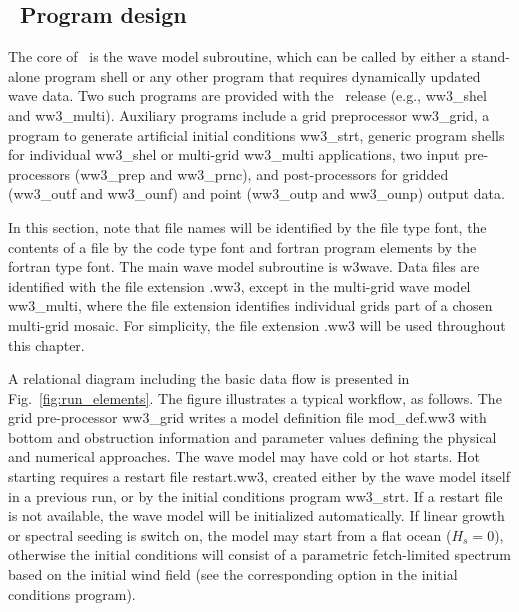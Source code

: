 \vsssub
\subsection{~Program design} \label{run:design}
\vssub

The core of \ws\ is the wave model subroutine, which can be
called by either a stand-alone program shell or any other program that
requires dynamically updated wave data. Two such programs are provided with
the \ws\ release (e.g., {\code ww3\_shel} and {\code ww3\_multi}). 
Auxiliary programs include a grid preprocessor {\code ww3\_grid}, a program to
generate artificial initial conditions {\code ww3\_strt}, generic program shells
for individual {\code ww3\_shel} or multi-grid {\code ww3\_multi} applications,
two input pre-processors ({\code ww3\_prep} and {\code ww3\_prnc}), and  
post-processors for gridded ({\code ww3\_outf} and {\code ww3\_ounf}) and point 
({\code ww3\_outp} and {\code ww3\_ounp}) output data.

In this section, note that file names will be identified by the {\file
file} type font, the contents of a file by the {\code code} type font and {\sc
fortran} program elements by the {\F fortran} type font. The main wave model 
subroutine is {\F w3wave}. Data files are identified with the
file extension {\file .ww3}, except in the multi-grid wave model {\file
ww3\_multi}, where the file extension identifies individual grids part of a chosen
multi-grid mosaic. For simplicity, the file extension {\file .ww3} will be used 
throughout this chapter.  

A relational diagram including the basic data flow is presented in 
Fig.~\ref{fig:run_elements}. The figure illustrates a typical workflow, as follows.
 The grid pre-processor {\code ww3\_grid} writes a model definition file {\file mod\_def.ww3} with
bottom and obstruction information and parameter values defining the physical
and numerical approaches. The wave model may have cold or hot starts. 
Hot starting requires a restart file {\file restart.ww3}, created either
by the wave model itself in a previous run, or by the initial conditions program {\code ww3\_strt}.
If a restart file is not available, the wave model will be initialized automatically.
If linear growth or spectral seeding is switch on, the model may start from a flat ocean ($H_s
= 0$), otherwise the initial conditions will consist of a parametric
fetch-limited spectrum based on the initial wind field (see the corresponding
option in the initial conditions program).  

